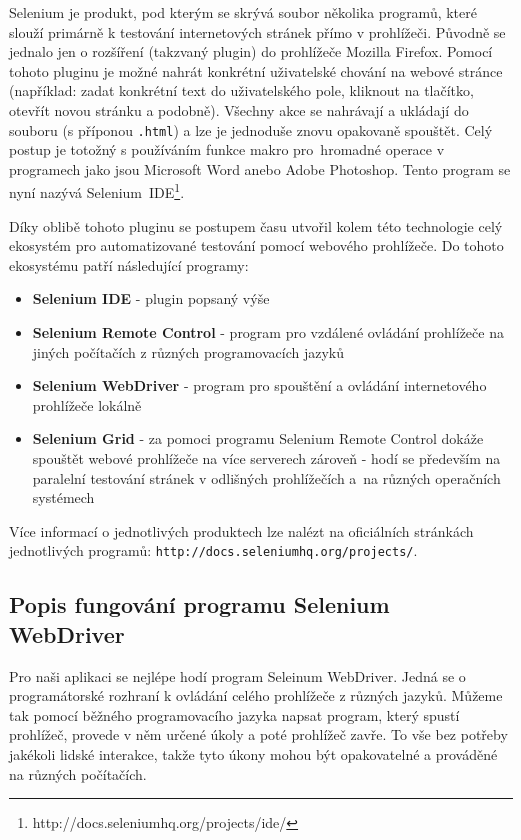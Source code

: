 \documentclass[thesis=M,czech]{FITthesis}[2013/05/10]
\begin{document}
Selenium je produkt, pod kterým se skrývá soubor několika programů, které slouží primárně k testování internetových stránek přímo v prohlížeči. Původně se jednalo jen o rozšíření (takzvaný plugin) do prohlížeče Mozilla Firefox. Pomocí tohoto pluginu je možné nahrát konkrétní uživatelské chování na webové stránce (například: zadat konkrétní text do uživatelského pole, kliknout na tlačítko, otevřít novou stránku a podobně). Všechny akce se nahrávají a ukládají do souboru (s příponou \verb|.html|) a lze je jednoduše znovu opakovaně spouštět. Celý postup je totožný s používáním funkce makro pro~hromadné operace v programech jako jsou Microsoft Word anebo Adobe Photoshop. Tento program se nyní nazývá Selenium~IDE\footnote{http://docs.seleniumhq.org/projects/ide/}.

Díky oblibě tohoto pluginu se postupem času utvořil kolem této technologie celý ekosystém pro automatizované testování pomocí webového prohlížeče. Do tohoto ekosystému patří následující programy:

\begin{itemize}
  \item \textbf{Selenium IDE} - plugin popsaný výše
  \item \textbf{Selenium Remote Control} - program pro vzdálené ovládání prohlížeče na jiných počítačích z různých programovacích jazyků
  \item \textbf{Selenium WebDriver} - program pro spouštění a  ovládání internetového prohlížeče lokálně
  \item \textbf{Selenium Grid} - za pomoci programu Selenium Remote Control dokáže spouštět webové prohlížeče na více serverech zároveň - hodí se především na paralelní testování stránek v odlišných prohlížečích a~na různých operačních systémech
\end{itemize}

Více informací o jednotlivých produktech lze nalézt na oficiálních stránkách jednotlivých programů: \verb|http://docs.seleniumhq.org/projects/|. 

\subsection{Popis fungování programu Selenium WebDriver}

Pro naši aplikaci se nejlépe hodí program Seleinum WebDriver. Jedná se o programátorské rozhraní k ovládání celého prohlížeče z různých jazyků. Můžeme tak pomocí běžného programovacího jazyka napsat program, který spustí prohlížeč, provede v něm určené úkoly a poté prohlížeč zavře. To vše bez potřeby jakékoli lidské interakce, takže tyto úkony mohou být opakovatelné a prováděné na různých počítačích.
\end{document}
